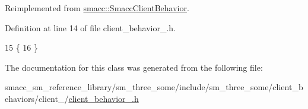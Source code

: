 Reimplemented from \hyperlink{classsmacc_1_1SmaccClientBehavior_a7962382f93987c720ad432fef55b123f}{smacc\+::\+Smacc\+Client\+Behavior}.



Definition at line 14 of file client\+\_\+behavior\+\_.\+h.


\begin{DoxyCode}
15     \{
16     \}
\end{DoxyCode}


The documentation for this class was generated from the following file\+:\begin{DoxyCompactItemize}
\item 
smacc\+\_\+sm\+\_\+reference\+\_\+library/sm\+\_\+three\+\_\+some/include/sm\+\_\+three\+\_\+some/client\+\_\+behaviors/client\+\_/\hyperlink{client__behavior__1_8h}{client\+\_\+behavior\+\_.\+h}\end{DoxyCompactItemize}
